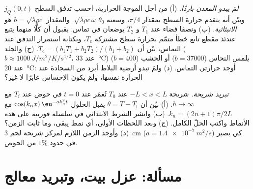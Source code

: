 \begin{exercise}[$\star\star\star$]\label{exo:b2:heat-conduction:11}
\emph{لمَ يبدو المعدن باردًا.} (أ) من أجل الموجة الحرارية، احسب
تدفق السطح $j_Q(0,t)$ وبيّن أنه يتقدم حرارة السطح بمقدار
$\pi/4$، وسعته $\sqrt{\lambda\rho c\,\omega}\,\theta_0$. والمقدار
$b = \sqrt{\lambda\rho c}$ هو \emph{الانبثاثية}. (ب) ونصفا فضاء
عند $T_1$ و $T_2$ يوضعان في تماس: بقبول أن
كلًّا منهما يتبع عندئذ مقطع تابع خطأ متمّم بحرارة سطح مشتركة
$T_{\text{c}}$، وبكتابة استمرار التدفق عند التماس،
بيّن أن $T_{\text{c}} = (b_1T_1 + b_2T_2)/(b_1 + b_2)$. (ج) والجلد
($b \approx \qty{1000}{J/m^2/K/s^{1/2}}$، عند \qty{33}{\celsius}) يلمس
النحاس ($b = 37000$) أو الخشب ($b = 400$) عند \qty{20}{\celsius}: أوجد حرارتي
التماس. (د) ولمَ تبدو أرضية البلاط أبرد من السجادة عند
الحرارة نفسها، ولمَ يكون الإحساس عابرًا لا غير؟
\end{exercise}

\begin{exercise}[$\star\star\star$]\label{exo:b2:heat-conduction:12}
\emph{تبريد شريحة.} شريحة $-L < x < L$ عند $T_0$ تُغمَر عند $t =
0$ في حوض عند $T_{\text{f}}$ مع $h \to \infty$. (أ) بيّن أن $\theta =
T - T_{\text{f}}$ يقبل الحلول $\cos(k_nx)\,\eu^{-ak_n^2t}$ مع $k_n
= (2n+1)\pi/2L$. (ب) وانشر الشرط الابتدائي في سلسلة فورييه
على هذه الأنماط واكتب الحلّ الكامل. (ج) وبعد
اللحظات الأولى، أي نمط يبقى، وما ثابت الزمن؟ (د) وأوجد الزمن
اللازم لمركز شريحة لحم \qty{3}{cm} ($a = \qty{1.4e-7}{m^2/s}$) كي يصير
في حدود $1\%$ من الحوض.
\end{exercise}

\section{مسألة: عزل بيت، وتبريد معالج}

